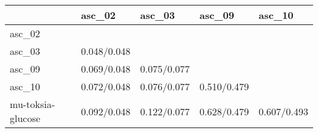 \begin{tabular}{lllll}
\toprule
{} &       asc\_02 &       asc\_03 &       asc\_09 &       asc\_10 \\
\midrule
asc\_02            &              &              &              &              \\
asc\_03            &  0.048/0.048 &              &              &              \\
asc\_09            &  0.069/0.048 &  0.075/0.077 &              &              \\
asc\_10            &  0.072/0.048 &  0.076/0.077 &  0.510/0.479 &              \\
mu-toksia-glucose &  0.092/0.048 &  0.122/0.077 &  0.628/0.479 &  0.607/0.493 \\
\bottomrule
\end{tabular}
